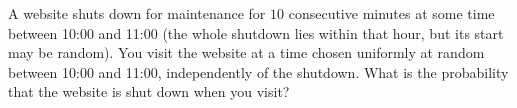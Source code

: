 A website shuts down for maintenance for $10$ consecutive minutes at some time between 10:00 and 11:00 (the whole shutdown lies within that hour, but its start may be random). You visit the website at a time chosen uniformly at random between 10:00 and 11:00, independently of the shutdown. What is the probability that the website is shut down when you visit?
